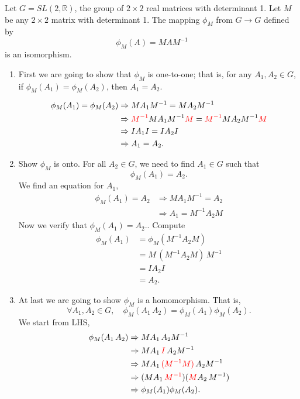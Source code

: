 \begin{example}
    Let $G=SL(2, \mathbb{R})$, the group of $2 \times 2$ real matrices with determinant 1. Let $M$ be 
any $2\times 2$ matrix with determinant 1. The mapping $\phi_M$ from $G \to G$ defined by
\[
    \phi_M(A) = MAM^{-1}
\]
is an isomorphism.
\end{example}
\begin{solution}
    \begin{enumerate}
        \item First we are going to show that $\phi_M$ is one-to-one; that is,
        for any $A_1, A_2 \in G$, if $\phi_M(A_1) = \phi_M(A_2)$, then $A_1 = A_2$.

        \begin{align*}
            \phi_M(A_1) = \phi_M(A_2) &\Rightarrow MA_1M^{-1} = MA_2M^{-1} \\
            &\Rightarrow {\color{red} M^{-1}} MA_1M^{-1} {\color{red} M}= {\color{red} M^{-1}} MA_2M^{-1} {\color{red} M}\\
            &\Rightarrow IA_1I = IA_2I \\
            &\Rightarrow A_1 = A_2.
        \end{align*}

        \item Show $\phi_M$ is onto. For all $A_2 \in G$, we need to find $A_1 \in G$ such that 
            \[
                \phi_M(A_1) = A_2.
            \]
            We find an equation for $A_1$,
            \begin{align*}
                \phi_M(A_1) = A_2 &\Rightarrow MA_1M^{-1} = A_2\\
                &\Rightarrow A_1 = M^{-1}A_2M
            \end{align*}
            Now we verify that $\phi_M(A_1) = A_2.$. Compute
            \begin{align*}
                \phi_M(A_1) &= \phi_M(M^{-1}A_2M)\\
                &= M\, (M^{-1}A_2M) \, M^{-1}\\
                &= IA_2I\\
                &= A_2.
            \end{align*}
        
        \item At last we are going to show $\phi_M$ is a homomorphism. That is,
            \[
                \forall A_1, A_2 \in G, \quad \phi_M(A_1\, A_2) = \phi_M(A_1)\phi_M(A_2).
            \]
            We start from LHS,
            \begin{align*}
                \phi_M(A_1\, A_2) &\Rightarrow MA_1\, A_2 M^{-1}\\
                &\Rightarrow MA_1\, {\color{red} I}\, A_2 M^{-1}\\
                &\Rightarrow MA_1\, {\color{red} (M^{-1} M)}\, A_2 M^{-1}\\
                &\Rightarrow (MA_1\,{\color{red}  M^{-1}}) ({\color{red} M} A_2\, M^{-1})\\
                &\Rightarrow \phi_M(A_1)\phi_M(A_2).
            \end{align*}
    \end{enumerate}


\end{solution}
